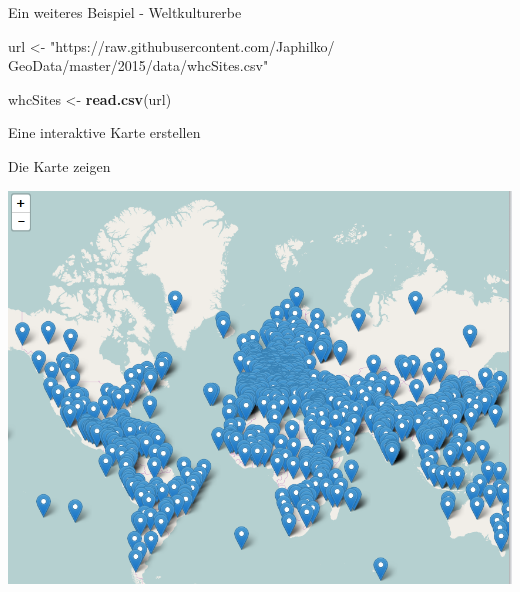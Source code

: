 \documentclass[ignorenonframetext,]{beamer}
\newenvironment{Shaded}{\begin{snugshade}}{\end{snugshade}}
\newcommand{\CommentTok}[1]{\textcolor[rgb]{0.56,0.35,0.01}{\textit{#1}}}
\newcommand{\DataTypeTok}[1]{\textcolor[rgb]{0.13,0.29,0.53}{#1}}
\newcommand{\KeywordTok}[1]{\textcolor[rgb]{0.13,0.29,0.53}{\textbf{#1}}}
\newcommand{\NormalTok}[1]{#1}
\newcommand{\OperatorTok}[1]{\textcolor[rgb]{0.81,0.36,0.00}{\textbf{#1}}}
\newcommand{\StringTok}[1]{\textcolor[rgb]{0.31,0.60,0.02}{#1}}
\begin{document}
\begin{frame}[fragile]{Ein weiteres Beispiel - Weltkulturerbe}
\protect\hypertarget{ein-weiteres-beispiel---weltkulturerbe}{}

\begin{Shaded}
\begin{Highlighting}[]
\NormalTok{url <-}\StringTok{ "https://raw.githubusercontent.com/Japhilko/}
\StringTok{GeoData/master/2015/data/whcSites.csv"}

\NormalTok{whcSites <-}\StringTok{ }\KeywordTok{read.csv}\NormalTok{(url) }
\end{Highlighting}
\end{Shaded}

\end{frame}

\begin{frame}[fragile]{Eine interaktive Karte erstellen}
\protect\hypertarget{eine-interaktive-karte-erstellen}{}

\begin{Shaded}
\end{Shaded}

\end{frame}

\begin{frame}{Die Karte zeigen}
\protect\hypertarget{die-karte-zeigen}{}

\includegraphics{figure/WHCPopUps.PNG}

\end{frame}
\end{document}

